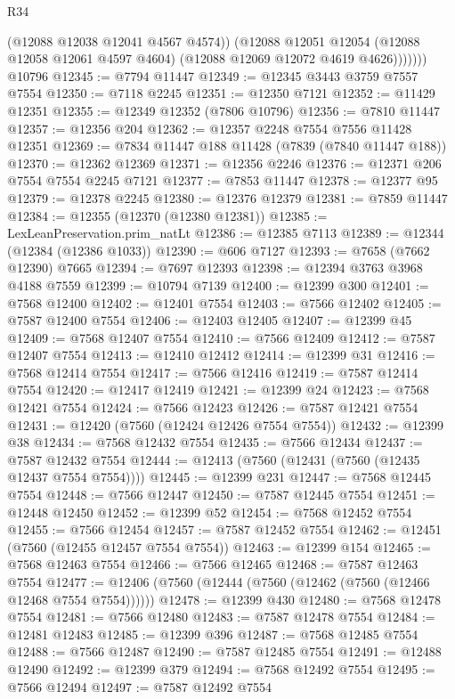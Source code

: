 \begin{lexlean}{R34}
\begin{coremodule}
                (@12088 @12038 @12041 @4567 @4574))
              (@12088
                @12051
                @12054
                (@12088 @12058 @12061 @4597 @4604)
                (@12088 @12069 @12072 @4619 @4626)))))))
    @10796
@12345 := @7794 @11447
@12349 := @12345 @3443 @3759 @7557 @7554
@12350 := @7118 @2245
@12351 := @12350 @7121
@12352 := @11429 @12351
@12355 := @12349 @12352 (@7806 @10796)
@12356 := @7810 @11447
@12357 := @12356 @204
@12362 := @12357 @2248 @7554 @7556 @11428 @12351
@12369 := @7834 @11447 @188 @11428 (@7839 (@7840 @11447 @188))
@12370 := @12362 @12369
@12371 := @12356 @2246
@12376 := @12371 @206 @7554 @7554 @2245 @7121
@12377 := @7853 @11447
@12378 := @12377 @95
@12379 := @12378 @2245
@12380 := @12376 @12379
@12381 := @7859 @11447
@12384 := @12355 (@12370 (@12380 @12381))
@12385 := LexLeanPreservation.prim_natLt
@12386 := @12385 @7113
@12389 := @12344 (@12384 (@12386 @1033))
@12390 := @606 @7127
@12393 := @7658 (@7662 @12390) @7665
@12394 := @7697 @12393
@12398 := @12394 @3763 @3968 @4188 @7559
@12399 := @10794 @7139
@12400 := @12399 @300
@12401 := @7568 @12400
@12402 := @12401 @7554
@12403 := @7566 @12402
@12405 := @7587 @12400 @7554
@12406 := @12403 @12405
@12407 := @12399 @45
@12409 := @7568 @12407 @7554
@12410 := @7566 @12409
@12412 := @7587 @12407 @7554
@12413 := @12410 @12412
@12414 := @12399 @31
@12416 := @7568 @12414 @7554
@12417 := @7566 @12416
@12419 := @7587 @12414 @7554
@12420 := @12417 @12419
@12421 := @12399 @24
@12423 := @7568 @12421 @7554
@12424 := @7566 @12423
@12426 := @7587 @12421 @7554
@12431 := @12420 (@7560 (@12424 @12426 @7554 @7554))
@12432 := @12399 @38
@12434 := @7568 @12432 @7554
@12435 := @7566 @12434
@12437 := @7587 @12432 @7554
@12444 := @12413 (@7560 (@12431 (@7560 (@12435 @12437 @7554 @7554))))
@12445 := @12399 @231
@12447 := @7568 @12445 @7554
@12448 := @7566 @12447
@12450 := @7587 @12445 @7554
@12451 := @12448 @12450
@12452 := @12399 @52
@12454 := @7568 @12452 @7554
@12455 := @7566 @12454
@12457 := @7587 @12452 @7554
@12462 := @12451 (@7560 (@12455 @12457 @7554 @7554))
@12463 := @12399 @154
@12465 := @7568 @12463 @7554
@12466 := @7566 @12465
@12468 := @7587 @12463 @7554
@12477 := @12406 (@7560 (@12444 (@7560 (@12462 (@7560 (@12466 @12468 @7554 @7554))))))
@12478 := @12399 @430
@12480 := @7568 @12478 @7554
@12481 := @7566 @12480
@12483 := @7587 @12478 @7554
@12484 := @12481 @12483
@12485 := @12399 @396
@12487 := @7568 @12485 @7554
@12488 := @7566 @12487
@12490 := @7587 @12485 @7554
@12491 := @12488 @12490
@12492 := @12399 @379
@12494 := @7568 @12492 @7554
@12495 := @7566 @12494
@12497 := @7587 @12492 @7554

\end{coremodule}
\end{lexlean}
